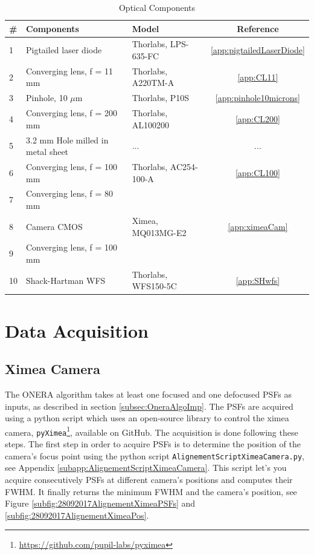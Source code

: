 \begin{table}
\caption{Optical Components}
\label{tab:optComp}
\centering
\begin{tabular}{|l|l|l|c|}
\hline
\textbf{\#}& \textbf{Components} & \textbf{Model} & \textbf{Reference} \\\hline
1 & Pigtailed laser diode & Thorlabs, LPS-635-FC & \ref{app:pigtailedLaserDiode} \\\hline
2 & Converging lens, f = 11 mm & Thorlabs, A220TM-A & \ref{app:CL11} \\\hline
3 & Pinhole, 10 $\mu$m & Thorlabs, P10S & \ref{app:pinhole10microns} \\\hline
4 & Converging lens, f = 200 mm & Thorlabs, AL100200 & \ref{app:CL200} \\\hline
5 & 3.2 mm Hole milled in metal sheet & ... & ... \\\hline
6 & Converging lens, f = 100 mm & Thorlabs, AC254-100-A & \ref{app:CL100} \\\hline
7 & Converging lens, f = 80 mm & & \\\hline
8 & Camera CMOS & Ximea, MQ013MG-E2 & \ref{app:ximeaCam} \\\hline
9 & Converging lens, f = 100 mm & & \\\hline
10 & Shack-Hartman WFS & Thorlabs, WFS150-5C & \ref{app:SHwfs} \\\hline
\end{tabular}
\end{table}

\section{Data Acquisition}
\label{sec:DataAcquis}

\subsection{Ximea Camera}
\label{subsec:acquisXimCam}

The ONERA algorithm takes at least one focused and one defocused PSFs as inputs, as described in section \ref{subsec:OneraAlgoImp}. The PSFs are acquired using a python script which uses an open-source library to control the ximea camera, \verb|pyXimea|\footnote{\url{https://github.com/pupil-labs/pyximea}}, available on GitHub. The acquisition is done following these steps. The first step in order to acquire PSFs is to determine the position of the camera's focus point using the python script \verb|AlignementScriptXimeaCamera.py|, see Appendix \ref{subapp:AlignementScriptXimeaCamera}. This script let's you acquire consecutively PSFs at different camera's positions and computes their FWHM. It finally returns the minimum FWHM and the camera's position, see Figure \ref{subfig:28092017AlignementXimeaPSFs} and \ref{subfig:28092017AlignementXimeaPos}.

